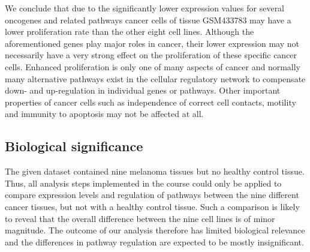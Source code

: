 We conclude that due to the significantly lower expression values for several
oncogenes and related pathways cancer cells of tissue GSM433783 may have a lower
proliferation rate than the other eight cell lines. Although the aforementioned
genes play major roles in cancer, their lower expression may not necessarily
have a very strong effect on the proliferation of these specific cancer cells.
Enhanced proliferation is only one of many aspects of cancer and normally many
alternative pathways exist in the cellular regulatory network to compensate
down- and up-regulation in individual genes or pathways. Other important
properties of cancer cells such as independence of correct cell contacts,
motility and immunity to apoptosis may not be affected at all.


\subsection{Biological significance}
The given dataset contained nine melanoma tissues but no healthy control tissue.
Thus, all analysis steps implemented in the course could only be applied to
compare expression levels and regulation of pathways between the nine different
cancer tissues, but not with a healthy control tissue. Such a comparison is
likely to reveal that the overall difference between the nine cell lines is of
minor magnitude. The outcome of our analysis therefore has limited biological
relevance and the differences in pathway regulation are expected to be mostly
insignificant. %

% 
